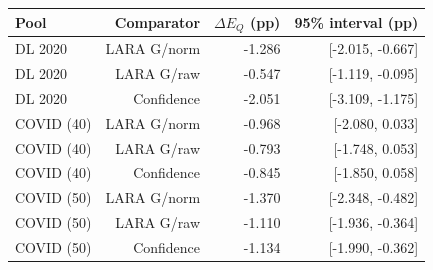 \begin{tabular}{@{}lrrr@{}}
\toprule
Pool & Comparator & $\Delta E_Q$ (pp) & 95\% interval (pp) \\
\midrule
DL 2020 & LARA G/norm & -1.286 & [-2.015, -0.667] \\
DL 2020 & LARA G/raw & -0.547 & [-1.119, -0.095] \\
DL 2020 & Confidence & -2.051 & [-3.109, -1.175] \\
COVID (40) & LARA G/norm & -0.968 & [-2.080, 0.033] \\
COVID (40) & LARA G/raw & -0.793 & [-1.748, 0.053] \\
COVID (40) & Confidence & -0.845 & [-1.850, 0.058] \\
COVID (50) & LARA G/norm & -1.370 & [-2.348, -0.482] \\
COVID (50) & LARA G/raw & -1.110 & [-1.936, -0.364] \\
COVID (50) & Confidence & -1.134 & [-1.990, -0.362] \\
\bottomrule
\end{tabular}
